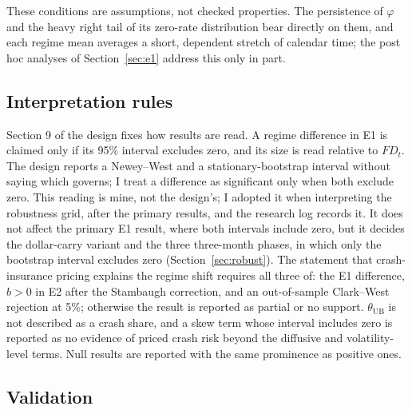 \documentclass[11pt]{article}
\theoremstyle{result}
\newcommand{\FD}{\mathit{FD}}
\newcommand{\thUB}{\theta_{\mathrm{UB}}}
\begin{document}
These conditions are assumptions, not checked properties. The persistence of $\varphi$ and the heavy right tail of its zero-rate distribution bear directly on them, and each regime mean averages a short, dependent stretch of calendar time; the post hoc analyses of Section~\ref{sec:e1} address this only in part.

\subsection{Interpretation rules}

Section 9 of the design fixes how results are read. A regime difference in E1 is claimed only if its 95\% interval excludes zero, and its size is read relative to $\FD_t$. The design reports a Newey--West and a stationary-bootstrap interval without saying which governs; I treat a difference as significant only when both exclude zero. This reading is mine, not the design's; I adopted it when interpreting the robustness grid, after the primary results, and the research log records it. It does not affect the primary E1 result, where both intervals include zero, but it decides the dollar-carry variant and the three three-month phases, in which only the bootstrap interval excludes zero (Section~\ref{sec:robust}). The statement that crash-insurance pricing explains the regime shift requires all three of: the E1 difference, $b>0$ in E2 after the Stambaugh correction, and an out-of-sample Clark--West rejection at 5\%; otherwise the result is reported as partial or no support. $\thUB$ is not described as a crash share, and a skew term whose interval includes zero is reported as no evidence of priced crash risk beyond the diffusive and volatility-level terms. Null results are reported with the same prominence as positive ones.

\subsection{Validation}\label{sec:val}
\end{document}
